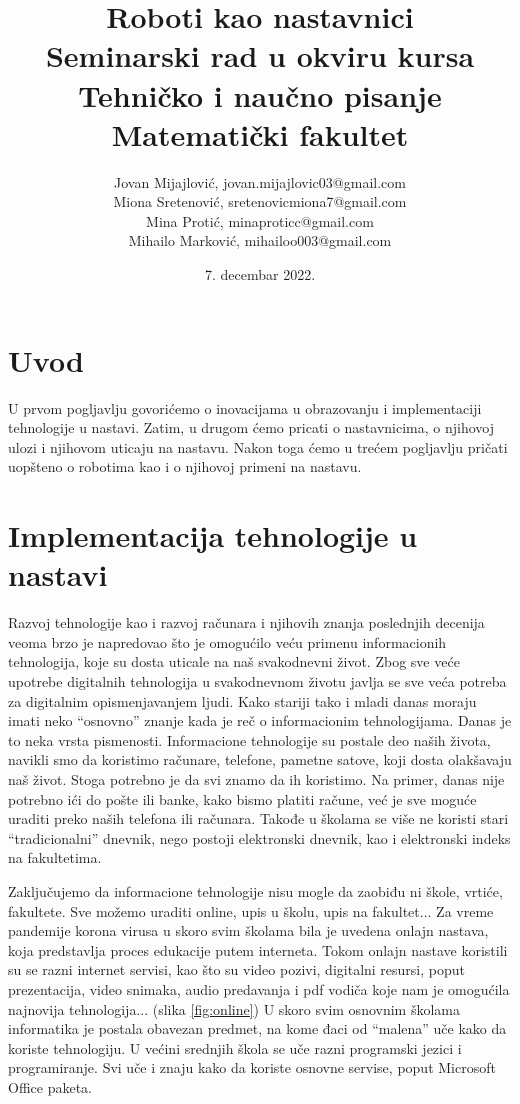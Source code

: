\documentclass[a4paper]{article}
\title{Roboti kao nastavnici\small \\Seminarski rad u okviru kursa\\Tehničko i naučno pisanje\\Matematički fakultet}
\author{Jovan Mijajlović, jovan.mijajlovic03@gmail.com\\Miona Sretenović, sretenovicmiona7@gmail.com\\Mina Protić, minaproticc@gmail.com\\Mihailo Marković, mihailoo003@gmail.com}
\date{7. decembar 2022.}
\begin{document}
\maketitle


\tableofcontents
\newpage

\section{Uvod}
\label{sec:uvod}

U prvom pogljavlju govorićemo o inovacijama u obrazovanju i implementaciji tehnologije u nastavi. Zatim, u drugom ćemo pricati o nastavnicima, o njihovoj ulozi i njihovom uticaju na nastavu. Nakon toga ćemo u trećem pogljavlju pričati uopšteno o robotima kao i o njihovoj primeni na nastavu.

\section{Implementacija tehnologije u nastavi}
\label{sec:naslov1}

Razvoj tehnologije kao i razvoj računara i njihovih znanja poslednjih decenija veoma brzo je napredovao što je omogućilo veću primenu informacionih tehnologija, koje su dosta uticale na naš svakodnevni život. Zbog sve veće upotrebe digitalnih tehnologija u svakodnevnom životu javlja se sve veća potreba za digitalnim opismenjavanjem ljudi. Kako stariji tako i mladi danas moraju imati neko “osnovno” znanje kada je reč o informacionim tehnologijama. Danas je to neka vrsta pismenosti. Informacione tehnologije su postale deo naših života, navikli smo da koristimo računare, telefone, pametne satove, koji dosta olakšavaju naš život. Stoga potrebno je da svi znamo da ih koristimo. Na primer, danas nije potrebno ići do pošte ili banke, kako bismo platiti račune, već je sve moguće uraditi preko naših telefona ili računara. Takođe u školama se više ne koristi stari “tradicionalni” dnevnik, nego postoji elektronski dnevnik, kao i elektronski indeks na fakultetima.

Zaključujemo da informacione tehnologije nisu mogle da zaobiđu ni škole, vrtiće, fakultete. Sve možemo uraditi online, upis u školu, upis na fakultet... Za vreme pandemije korona virusa u skoro svim školama bila je uvedena onlajn nastava, koja predstavlja proces edukacije putem interneta. Tokom onlajn nastave koristili su se razni internet servisi, kao što su video pozivi, digitalni resursi, poput prezentacija, video snimaka, audio predavanja i pdf vodiča koje nam je omogućila najnovija tehnologija... (slika \ref{fig:online}) U skoro svim osnovnim školama informatika je postala obavezan predmet, na kome đaci od “malena” uče kako da koriste tehnologiju. U većini srednjih škola se uče razni programski jezici i programiranje. Svi uče i znaju kako da koriste osnovne servise, poput Microsoft Office paketa.
\end{document}

